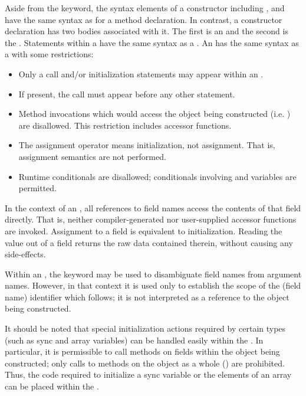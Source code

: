 Aside from the  keyword, the syntax elements of a constructor
including ,  and 
have the same syntax as for a method declaration.  In contrast,
a constructor declaration has two bodies associated with it.  The first is
an  and the second is the .
Statements within a  have the same syntax as
a . An  has the same syntax as
a  with some restrictions:
\begin{itemize}
\item Only a  call and/or initialization statements
may appear within an .
\item If present, the  call must appear before any other statement.
\item Method invocations which would
access the object being constructed (i.e. ) are disallowed.  This
restriction includes accessor functions.  
\item The assignment operator \chpl{=} means initialization, not assignment.
That is, assignment semantics are not performed.
\item Runtime conditionals are disallowed; conditionals involving 
and  variables are permitted.
\end{itemize}
\noindent
In the context of an
, all references to field names access the contents
of that field directly.  That is, neither compiler-generated nor user-supplied
accessor functions are invoked.  Assignment to a field is equivalent to
initialization.  Reading the value out of a field returns the raw data contained
therein, without causing any side-effects.  

Within an , the  keyword may be used to
disambiguate field names from argument names.  However, in that context it is used
only to establish the scope of the (field name) identifier which follows; it is
not interpreted as a reference to the object being constructed.

It should be noted that special initialization actions required by certain types
(such as sync and array variables) can be handled easily within
the .  In particular, it is permissible to call
methods on fields within the object being constructed; only calls to methods on
the object as a whole () are prohibited.  Thus, the code required to
initialize a sync variable or the elements of an array can be placed within the
.

